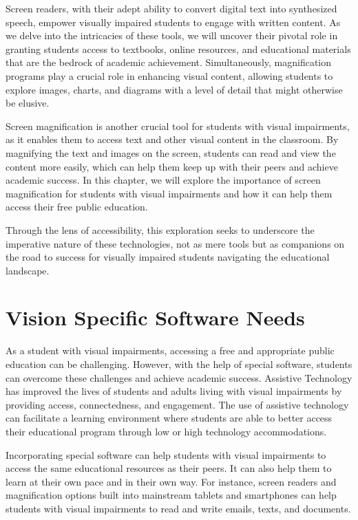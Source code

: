 \documentclass[12pt,letterpaper,twoside]{extreport}
\begin{document}
Screen readers, with their adept ability to convert digital text into synthesized speech, empower visually impaired students to engage with written content. As we delve into the intricacies of these tools, we will uncover their pivotal role in granting students access to textbooks, online resources, and educational materials that are the bedrock of academic achievement. Simultaneously, magnification programs play a crucial role in enhancing visual content, allowing students to explore images, charts, and diagrams with a level of detail that might otherwise be elusive.

Screen magnification is another crucial tool for students with visual impairments, as it enables them to access text and other visual content in the classroom.  By magnifying the text and images on the screen, students can read and view the content more easily, which can help them keep up with their peers and achieve academic success. In this chapter, we will explore the importance of screen magnification for students with visual impairments and how it can help them access their free public education.

Through the lens of accessibility, this exploration seeks to underscore the imperative nature of these technologies, not as mere tools but as companions on the road to success for visually impaired students navigating the educational landscape.

\pagebreak \hypertarget{software-needs}{}\section{Vision Specific Software Needs}\label{software-needs}
As a student with visual impairments, accessing a free and appropriate public education can be challenging. However, with the help of special software, students can overcome these challenges and achieve academic success. Assistive Technology has improved the lives of students and adults living with visual impairments by providing access, connectedness, and engagement. The use of assistive technology can facilitate a learning environment where students are able to better access their educational program through low or high technology accommodations.

Incorporating special software can help students with visual impairments to access the same educational resources as their peers. It can also help them to learn at their own pace and in their own way. For instance, screen readers and magnification options built into mainstream tablets and smartphones can help students with visual impairments to read and write emails, texts, and documents.
\end{document}
